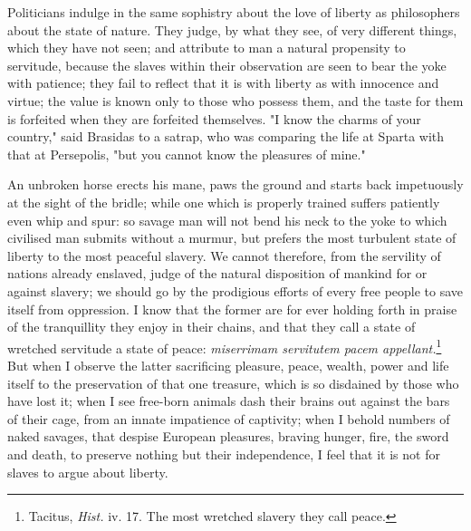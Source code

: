\documentclass[12pt]{report}
\begin{document}
Politicians indulge in the same sophistry about the love of liberty as philosophers about the state of nature. They judge, by what they see, of very different things, which they have not seen; and attribute to man a natural propensity to servitude, because the slaves within their observation are seen to bear the yoke with patience; they fail to reflect that it is with liberty as with innocence and virtue; the value is known only to those who possess them, and the taste for them is forfeited when they are forfeited themselves. "I know the charms of your country," said Brasidas to a satrap, who was comparing the life at Sparta with that at Persepolis, "but you cannot know the pleasures of mine."

An unbroken horse erects his mane, paws the ground and starts back impetuously at the sight of the bridle; while one which is properly trained suffers patiently even whip and spur: so savage man will not bend his neck to the yoke to which civilised man submits without a murmur, but prefers the most turbulent state of liberty to the most peaceful slavery. We cannot therefore, from the servility of nations already enslaved, judge of the natural disposition of mankind for or against slavery; we should go by the prodigious efforts of every free people to save itself from oppression. I know that the former are for ever holding forth in praise of the tranquillity they enjoy in their chains, and that they call a state of wretched servitude a state of peace: \textit{miserrimam servitutem pacem appellant.}\footnote{Tacitus, \textit{Hist.} iv. 17. The most wretched slavery they call peace.} But when I observe the latter sacrificing pleasure, peace, wealth, power and life itself to the preservation of that one treasure, which is so disdained by those who have lost it; when I see free-born animals dash their brains out against the bars of their cage, from an innate impatience of captivity; when I behold numbers of naked savages, that despise European pleasures, braving hunger, fire, the sword and death, to preserve nothing but their independence, I feel that it is not for slaves to argue about liberty.
\end{document}
